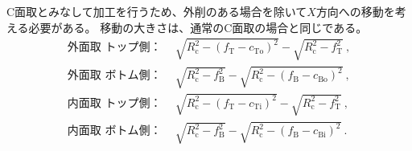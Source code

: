 \clearpage
C面取とみなして加工を行うため、外削のある場合を除いて$X$方向への移動を考える必要がある。
移動の大きさは、通常のC面取の場合と同じである。
\begin{align*}
  \text{外面取 トップ側：}&~~
  \sqrt{R_\mathrm c^2-\left(f_\mathrm T-c_\mathrm{To}\right)^2}-\sqrt{R_\mathrm c^2-f_\mathrm T^2}\ ,\\
  \text{外面取 ボトム側：}&~~
  \sqrt{R_\mathrm c^2-f_\mathrm B^2}-\sqrt{R_\mathrm c^2-\left(f_\mathrm B-c_\mathrm{Bo}\right)^2}\ ,\\
  \text{内面取 トップ側：}&~~
  \sqrt{R_\mathrm c^2-\left(f_\mathrm T-c_\mathrm{Ti}\right)^2}-\sqrt{R_\mathrm c^2-f_\mathrm T^2}\ ,\\
  \text{内面取 ボトム側：}&~~
  \sqrt{R_\mathrm c^2-f_\mathrm B^2}-\sqrt{R_\mathrm c^2-\left(f_\mathrm B-c_\mathrm{Bi}\right)^2}\ .
\end{align*}



